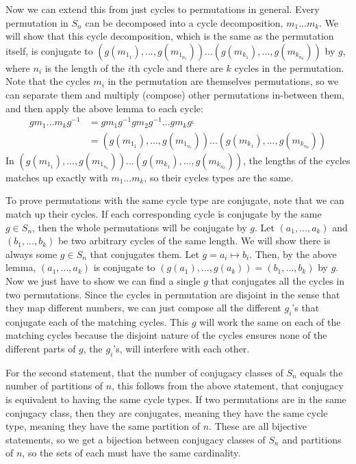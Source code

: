 \documentclass[fleqn]{article}
\begin{document}
        Now we can extend this from just cycles to permutations in general.  Every permutation in $S_n$ can be decomposed into a cycle decomposition, $m_1 ... m_k$.  We will show that this cycle decomposition, which is the same as the permutation itself, is conjugate to $(g(m_{1_1}), ..., g(m_{1_{n_1}})) ... (g(m_{k_1}), ..., g(m_{k_{n_k}}))$ by $g$, where $n_i$ is the length of the $i$th cycle and there are $k$ cycles in the permutation.  Note that the cycles $m_i$ in the permutation are themselves permutations, so we can separate them and multiply (compose) other permutations in-between them, and then apply the above lemma to each cycle:
        \begin{align}
            g m_1 ... m_k g^{-1} 
                &= g m_1 g^{-1} g m_2 g^{-1} ... g m_k g^{_1} \\
                &= (g(m_{1_1}), ..., g(m_{1_{n_1}})) ... (g(m_{k_1}), ..., g(m_{k_{n_k}}))
        \end{align}
        In $(g(m_{1_1}), ..., g(m_{1_{n_1}})) ... (g(m_{k_1}), ..., g(m_{k_{n_k}}))$, the lengths of the cycles matches up exactly with $m_1 ... m_k$, so their cycles types are the same.
        
        To prove permutations with the same cycle type are conjugate, note that we can match up their cycles.  If each corresponding cycle is conjugate by the same $g \in S_n$, then the whole permutations will be conjugate by $g$.  Let $(a_1, ..., a_k)$ and $(b_1, ..., b_k)$ be two arbitrary cycles of the same length.  We will show there is always some $g \in S_n$ that conjugates them.  Let $g = a_i \mapsto b_i$.  Then, by the above lemma, $(a_1, ..., a_k)$ is conjugate to $(g(a_1), ..., g(a_k)) = (b_1, ..., b_k)$ by $g$.  Now we just have to show we can find a single $g$ that conjugates all the cycles in two permutations.  Since the cycles in permutation are disjoint in the sense that they map different numbers, we can just compose all the different $g_i$'s that conjugate each of the matching cycles.  This $g$ will work the same on each of the matching cycles because the disjoint nature of the cycles ensures none of the different parts of $g$, the $g_i$'s, will interfere with each other.
        
        For the second statement, that the number of conjugacy classes of $S_n$ equals the number of partitions of $n$, this follows from the above statement, that conjugacy is equivalent to having the same cycle types.  If two permutations are in the same conjugacy class, then they are conjugates, meaning they have the same cycle type, meaning they have the same partition of $n$.  These are all bijective statements, so we get a bijection between conjugacy classes of $S_n$ and partitions of $n$, so the sets of each must have the same cardinality.
        
\end{document}
